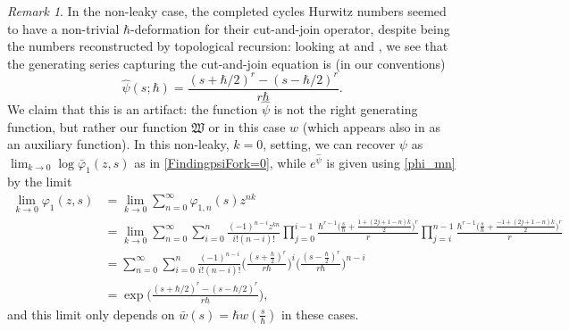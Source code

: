 \documentclass[10pt,a4paper,oneside,no-math,reqno]{amsart}%
\theoremstyle{plain}
\theoremstyle{definition}
\theoremstyle{remark}
\newtheorem{remark}[theorem]{Remark}
\numberwithin{equation}{section}
\renewcommand{\phi}{\varphi}
\newcommand{\mf}[1]{\mathfrak{#1}}
\newcommand{\1}{\mathds{1}}
\newcommand{\<}{\langle}
\renewcommand{\>}{\rangle}
\begin{document}
\begin{remark}
    In the non-leaky case, the completed cycles Hurwitz numbers seemed to have a non-trivial $\hbar$-deformation for their cut-and-join operator, despite being the numbers reconstructed by topological recursion: looking at \cite[Remark 1.4]{BDKS22} and \cite[Table 2]{BDKS24}, we see that the generating series capturing the cut-and-join equation is (in our conventions)
    \begin{equation}
        \hat{\psi} (s; \hbar ) = \frac{(s + \hbar/2)^r - (s - \hbar/2)^r}{r\hbar}.
    \end{equation}
    We claim that this is an artifact: the function $ \hat{\psi} $ is not the right generating function, but rather our function  $ \mf{W}$ or in this case $w$ (which appears also in \cite[Equation (58)]{BDKS24} as an auxiliary function). In this non-leaky, $k=0$, setting, we can recover $ \psi$ as $ \lim_{k\to 0} \log \bar{\phi}_1 (z,s)$ as in \cref{FindingpsiFork=0}, while $ e^{\hat{\psi}}$ is given using \cref{phi_mn} by the limit
    \begin{equation}
        \begin{split}
            \lim_{k \to 0} \phi_1 (z,s)
            &=
            \lim_{k \to 0} \sum_{n=0}^\infty \phi_{1,n} (s) z^{nk}
            \\
            &=
            \lim_{k \to 0} \sum_{n=0}^\infty \sum_{i=0}^n \frac{(-1)^{n-i}z^{kn}}{i!(n-i)!} \prod_{j=0}^{i-1} \frac{\hbar^{r-1}\big( \frac{s}{\hbar} + \frac{1 + (2j+1-n)k}{2} \big)^r }{r}  \prod_{j=i}^{n-1} \frac{\hbar^{r-1} \big( \frac{s}{\hbar} + \frac{-1 + (2j+1-n)k}{2} \big)^r }{r} 
            \\
            &=
            \sum_{n=0}^\infty \sum_{i=0}^n \frac{(-1)^{n-i}}{i!(n-i)!}  \Big( \frac{( s + \frac{\hbar}{2} )^r}{r\hbar} \Big)^i \Big( \frac{( s - \frac{\hbar}{2} )^r}{r\hbar} \Big)^{n-i}
            \\
            &=
            \exp \Big( \frac{(s + \hbar /2)^r - (s - \hbar/2)^r}{r \hbar} \Big),
        \end{split}
    \end{equation}
    and this limit only depends on $ \bar{w} (s) = \hbar w( \frac{s}{\hbar} )$ in these cases.
\end{remark}
\end{document}
